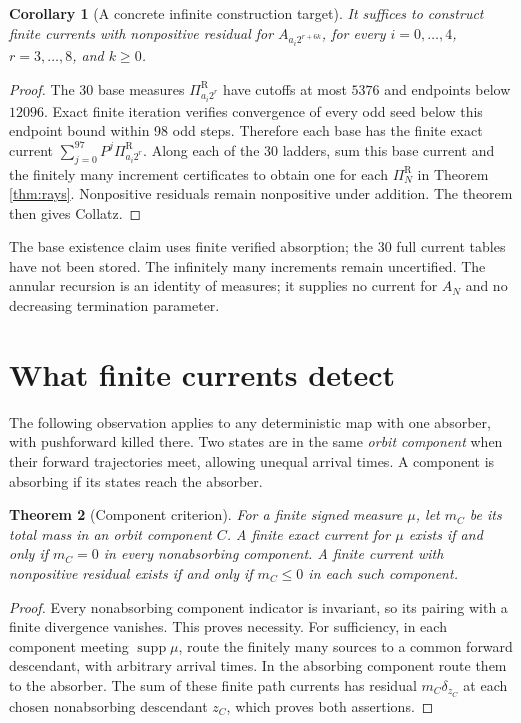 \documentclass[11pt]{article}
\newtheorem{theorem}{Theorem}
\newtheorem{corollary}[theorem]{Corollary}
\newcommand{\PiR}{\Pi^{\mathrm R}}
\newcommand{\supp}{\operatorname{supp}}
\begin{document}
\begin{corollary}[A concrete infinite construction target]
It suffices to construct finite currents with nonpositive residual for
$A_{a_i2^{r+6k}}$, for every $i=0,\ldots,4$, $r=3,\ldots,8$, and $k\ge0$.
\end{corollary}
\begin{proof}
The 30 base measures $\PiR_{a_i2^r}$ have cutoffs at most $5376$ and
endpoints below $12096$. Exact finite iteration verifies convergence of
every odd seed below this endpoint bound within 98 odd steps. Therefore
each base has the finite exact current $\sum_{j=0}^{97}P^j\PiR_{a_i2^r}$.
Along each of the 30 ladders, sum this base current and the finitely
many increment certificates to obtain one for each $\PiR_N$ in
Theorem \ref{thm:rays}. Nonpositive residuals remain nonpositive under
addition. The theorem then gives Collatz.
\end{proof}
The base existence claim uses finite verified absorption; the 30 full
current tables have not been stored. The infinitely many increments remain
uncertified.
The annular recursion is an identity of measures; it supplies no current
for $A_N$ and no decreasing termination parameter.

\section{What finite currents detect}
The following observation applies to any deterministic map with one
absorber, with pushforward killed there. Two states are in the same
\emph{orbit component} when their forward trajectories meet, allowing
unequal arrival times. A component is absorbing if its states reach the
absorber.

\begin{theorem}[Component criterion]
For a finite signed measure $\mu$, let $m_C$ be its total mass in an
orbit component $C$. A finite exact current for $\mu$ exists if and only if
$m_C=0$ in every nonabsorbing component. A finite current with nonpositive
residual exists if and only if $m_C\le0$ in each such component.
\end{theorem}
\begin{proof}
Every nonabsorbing component indicator is invariant, so its pairing with
a finite divergence vanishes. This proves necessity.
For sufficiency, in each component meeting $\supp\mu$, route the finitely
many sources to a common forward descendant, with arbitrary arrival
times. In the absorbing component route them to the absorber. The sum of
these finite path currents has residual $m_C\delta_{z_C}$ at each chosen
nonabsorbing descendant $z_C$, which proves both assertions.
\end{proof}
\end{document}
